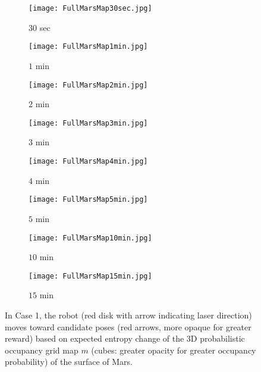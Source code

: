 \begin{figure}[!t]
	\centering
	\begin{subfigure}[t]{0.49\columnwidth}
           	\centering
          	\texttt{[image: FullMarsMap30sec.jpg]}
        		\caption{$30$ sec}
		\vspace*{0.025\textwidth}
    	\end{subfigure}
    	\begin{subfigure}[t]{0.49\columnwidth}
           	\centering
          	\texttt{[image: FullMarsMap1min.jpg]}
        		\caption{$1$ min}
		\vspace*{0.025\textwidth}
    	\end{subfigure}
	\centering
	\begin{subfigure}[t]{0.49\columnwidth}
           	\centering
          	\texttt{[image: FullMarsMap2min.jpg]}
        		\caption{$2$ min}
		\vspace*{0.025\textwidth}
    	\end{subfigure}
    	\begin{subfigure}[t]{0.49\columnwidth}
           	\centering
          	\texttt{[image: FullMarsMap3min.jpg]}
        		\caption{$3$ min}
		\vspace*{0.025\textwidth}
    	\end{subfigure}
	\centering
	\begin{subfigure}[t]{0.49\columnwidth}
           	\centering
          	\texttt{[image: FullMarsMap4min.jpg]}
        		\caption{$4$ min}
		\vspace*{0.025\textwidth}
    	\end{subfigure}
    	\begin{subfigure}[t]{0.49\columnwidth}
           	\centering
          	\texttt{[image: FullMarsMap5min.jpg]}
        		\caption{$5$ min}
		\vspace*{0.025\textwidth}
    	\end{subfigure}
	\centering
	\begin{subfigure}[t]{0.49\columnwidth}
           	\centering
          	\texttt{[image: FullMarsMap10min.jpg]}
        		\caption{$10$ min}
		\vspace*{0.025\textwidth}
    	\end{subfigure}
    	\begin{subfigure}[t]{0.49\columnwidth}
           	\centering
          	\texttt{[image: FullMarsMap15min.jpg]}
        		\caption{$15$ min}
		\vspace*{0.025\textwidth}
    	\end{subfigure}
\caption{In Case 1, the robot (red disk with arrow indicating laser direction) moves toward candidate poses (red arrows, more opaque for greater reward) based on expected entropy change of the 3D probabilistic occupancy grid map $m$ (cubes: greater opacity for greater occupancy probability) of the surface of Mars.}
\label{fig:mars3DogmCase1}
\end{figure}


